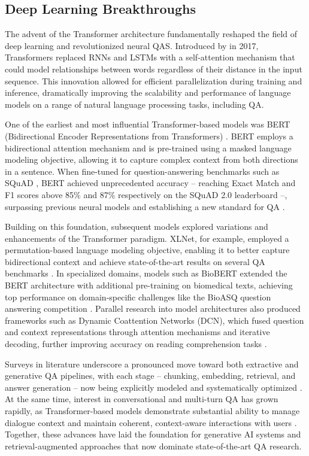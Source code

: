 \begin{spacing}{1.5}
\section{Deep Learning Breakthroughs}
The advent of the Transformer architecture fundamentally reshaped the field of deep learning and revolutionized neural QAS. Introduced by \citeauthor{vaswani_attention_2017} in 2017, Transformers replaced RNNs and LSTMs with a self-attention mechanism that could model relationships between words regardless of their distance in the input sequence. This innovation allowed for efficient parallelization during training and inference, dramatically improving the scalability and performance of language models on a range of natural language processing tasks, including QA.

One of the earliest and most influential Transformer-based models was BERT (Bidirectional Encoder Representations from Transformers) \citep{devlin_bert_2019}. BERT employs a bidirectional attention mechanism and is pre-trained using a masked language modeling objective, allowing it to capture complex context from both directions in a sentence. When fine-tuned for question-answering benchmarks such as SQuAD \citep{rajpurkar_squad_2016}, BERT achieved unprecedented accuracy -- reaching Exact Match and F1 scores above 85\% and 87\% respectively on the SQuAD 2.0 leaderboard --, surpassing previous neural models and establishing a new standard for QA \citep{li_death_2024}.

Building on this foundation, subsequent models explored variations and enhancements of the Transformer paradigm. XLNet, for example, employed a permutation-based language modeling objective, enabling it to better capture bidirectional context and achieve state-of-the-art results on several QA benchmarks \citep{yang_xlnet_2020}. In specialized domains, models such as BioBERT extended the BERT architecture with additional pre-training on biomedical texts, achieving top performance on domain-specific challenges like the BioASQ question answering competition \citep{yoon_pre-trained_2019}. Parallel research into model architectures also produced frameworks such as Dynamic Coattention Networks (DCN), which fused question and context representations through attention mechanisms and iterative decoding, further improving accuracy on reading comprehension tasks \citep{xiong_dynamic_2018}.

Surveys in literature underscore a pronounced move toward both extractive and generative QA pipelines, with each stage -- chunking, embedding, retrieval, and answer generation -- now being explicitly modeled and systematically optimized \citep{farea_understanding_2025}. At the same time, interest in conversational and multi-turn QA has grown rapidly, as Transformer-based models demonstrate substantial ability to manage dialogue context and maintain coherent, context-aware interactions with users \citep{yue_survey_2025,antoniou_survey_2022}. Together, these advances have laid the foundation for generative AI systems and retrieval-augmented approaches that now dominate state-of-the-art QA research.


\end{spacing}
